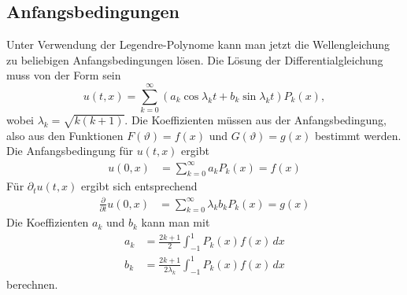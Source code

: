 \subsection{Anfangsbedingungen}
Unter Verwendung der Legendre-Polynome kann man jetzt die Wellengleichung
zu beliebigen Anfangsbedingungen lösen.
Die Lösung der Differentialgleichung muss von der Form sein
\[
u(t, x)=\sum_{k=0}^{\infty}(a_k\cos \lambda_k t+b_k\sin\lambda_k t)P_k(x),
\]
wobei $\lambda_k=\sqrt{k(k+1)}$.
Die Koeffizienten müssen aus der Anfangsbedingung, also aus den 
Funktionen $F(\vartheta)=f(x)$ und $G(\vartheta)=g(x)$ bestimmt werden.
Die Anfangsbedingung für $u(t,x)$ ergibt
\begin{align*}
u(0,x)
&=\sum_{k=0}^{\infty} a_kP_k(x)=f(x)
\end{align*}
Für $\partial_tu(t,x)$ ergibt sich entsprechend
\begin{align*}
\frac{\partial}{\partial t}u(0,x)
&=\sum_{k=0}^{\infty} \lambda_k b_kP_k(x)=g(x)
\end{align*}
Die Koeffizienten $a_k$ und $b_k$ kann man mit
\begin{align*}
a_k&=
\frac{2k+1}{2}\int_{-1}^1 P_k(x)f(x)\,dx
\\
b_k&=
\frac{2k+1}{2\lambda_k}\int_{-1}^1P_k(x)f(x)\,dx
\end{align*}
berechnen.

